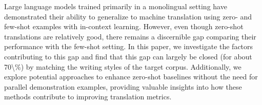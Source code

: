 Large language models trained primarily in a monolingual setting have demonstrated their ability to generalize to machine translation using zero- and few-shot examples with in-context learning. However, even though zero-shot translations are relatively good, there remains a discernible gap comparing their performance with the few-shot setting. In this paper, we investigate the factors contributing to this gap and find that this gap can largely be closed (for about 70\textbackslash{}\%) by matching the writing styles of the target corpus. Additionally, we explore potential approaches to enhance zero-shot baselines without the need for parallel demonstration examples, providing valuable insights into how these methods contribute to improving translation metrics.
